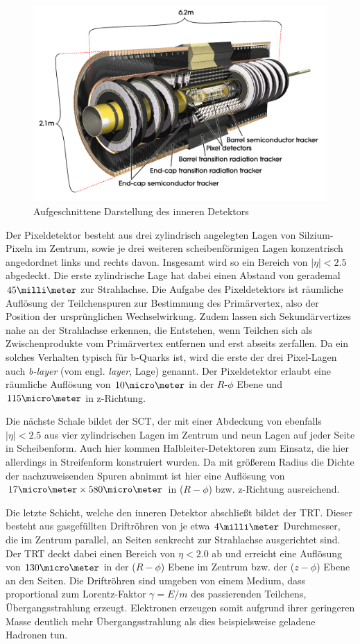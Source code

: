 \begin{figure}
    \centering
    \includegraphics[width=.8\textwidth]{img/inner_detector}
    \caption[Darstellung des inneren Detektors]
        {Aufgeschnittene Darstellung des inneren Detektors}
    \label{fig:inner_detector}
\end{figure}

Der Pixeldetektor besteht aus drei zylindrisch angelegten Lagen von
Silzium-Pixeln im Zentrum, sowie je drei weiteren scheibenförmigen Lagen
konzentrisch angedordnet links und rechts davon. Insgesamt wird so ein Bereich
von $|\eta| < 2.5$ abgedeckt. Die erste zylindrische Lage hat dabei einen
Abstand von gerademal $45\milli\meter$ zur Strahlachse. Die Aufgabe des
Pixeldetektors ist räumliche Auflösung der Teilchenspuren zur Bestimmung des
Primärvertex, also der Position der ursprünglichen Wechselwirkung. Zudem lassen
sich Sekundärvertizes nahe an der Strahlachse erkennen, die Entstehen, wenn
Teilchen sich als Zwischenprodukte vom Primärvertex entfernen und erst abseits
zerfallen. Da ein solches Verhalten typisch für b-Quarks ist, wird die erste
der drei Pixel-Lagen auch \textit{b-layer} (vom engl. \textit{layer}, Lage)
genannt. Der Pixeldetektor erlaubt eine räumliche Auflösung von
$10\micro\meter$ in der $R$-$\phi$ Ebene und $115\micro\meter$ in z-Richtung.

Die nächste Schale bildet der \acf{SCT}, der mit einer Abdeckung von ebenfalls
$|\eta| < 2.5$ aus vier zylindrischen Lagen im Zentrum und neun Lagen auf jeder
Seite in Scheibenform. Auch hier kommen Halbleiter-Detektoren zum Einsatz, die
hier allerdings in Streifenform konstruiert wurden. Da mit größerem Radius die
Dichte der nachzuweisenden Spuren abnimmt ist hier eine Auflösung von
$17\micro\meter \times 580\micro\meter$ in ($R-\phi$) bzw. z-Richtung
ausreichend.

Die letzte Schicht, welche den inneren Detektor abschließt bildet der
\acf{TRT}.  Dieser besteht aus gasgefüllten Driftröhren von je etwa
$4\milli\meter$ Durchmesser, die im Zentrum parallel, an Seiten senkrecht zur
Strahlachse ausgerichtet sind. Der \ac{TRT} deckt dabei einen Bereich von
$\eta<2.0$ ab und erreicht eine Auflösung von $130\micro\meter$ in der
($R-\phi$) Ebene im Zentrum bzw. der ($z-\phi$) Ebene an den Seiten. Die
Driftröhren sind umgeben von einem Medium, dass proportional zum Lorentz-Faktor
$\gamma=E/m$ des passierenden Teilchens, Übergangsstrahlung erzeugt. Elektronen
erzeugen somit aufgrund ihrer geringeren Masse deutlich mehr Übergangsstrahlung
als dies beispielsweise geladene Hadronen tun.




